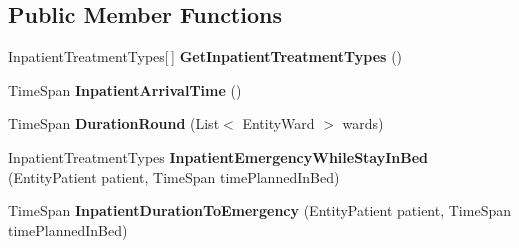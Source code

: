 \subsection*{Public Member Functions}
\begin{DoxyCompactItemize}
\item 
Inpatient\+Treatment\+Types\mbox{[}$\,$\mbox{]} {\bfseries Get\+Inpatient\+Treatment\+Types} ()\hypertarget{class_general_health_elements_1_1_input_output_1_1_inpatient_1_1_input_inpatient_detailed_intern_ad18849460fa1f7cb42ae1859fcb31f17}{}\label{class_general_health_elements_1_1_input_output_1_1_inpatient_1_1_input_inpatient_detailed_intern_ad18849460fa1f7cb42ae1859fcb31f17}

\item 
Time\+Span {\bfseries Inpatient\+Arrival\+Time} ()\hypertarget{class_general_health_elements_1_1_input_output_1_1_inpatient_1_1_input_inpatient_detailed_intern_a7fdefed04063a60131760738c457e0de}{}\label{class_general_health_elements_1_1_input_output_1_1_inpatient_1_1_input_inpatient_detailed_intern_a7fdefed04063a60131760738c457e0de}

\item 
Time\+Span {\bfseries Duration\+Round} (List$<$ Entity\+Ward $>$ wards)\hypertarget{class_general_health_elements_1_1_input_output_1_1_inpatient_1_1_input_inpatient_detailed_intern_ae92f479b9720e305d169935935aa6ed7}{}\label{class_general_health_elements_1_1_input_output_1_1_inpatient_1_1_input_inpatient_detailed_intern_ae92f479b9720e305d169935935aa6ed7}

\item 
Inpatient\+Treatment\+Types {\bfseries Inpatient\+Emergency\+While\+Stay\+In\+Bed} (Entity\+Patient patient, Time\+Span time\+Planned\+In\+Bed)\hypertarget{class_general_health_elements_1_1_input_output_1_1_inpatient_1_1_input_inpatient_detailed_intern_afb7bb1880f149c669351421f47c14251}{}\label{class_general_health_elements_1_1_input_output_1_1_inpatient_1_1_input_inpatient_detailed_intern_afb7bb1880f149c669351421f47c14251}

\item 
Time\+Span {\bfseries Inpatient\+Duration\+To\+Emergency} (Entity\+Patient patient, Time\+Span time\+Planned\+In\+Bed)\hypertarget{class_general_health_elements_1_1_input_output_1_1_inpatient_1_1_input_inpatient_detailed_intern_a44dd3dc8b9a13253164f1999c07a1091}{}\label{class_general_health_elements_1_1_input_output_1_1_inpatient_1_1_input_inpatient_detailed_intern_a44dd3dc8b9a13253164f1999c07a1091}


\end{DoxyCompactItemize}
